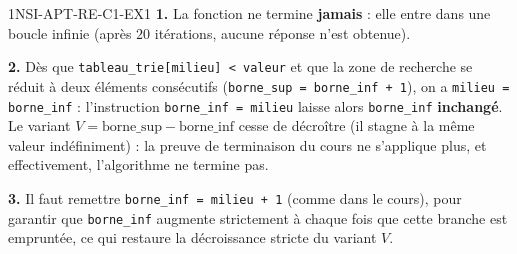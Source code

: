 
\begin{corrige}{1NSI-APT-RE-C1-EX1}
\textbf{1.} La fonction ne termine \textbf{jamais} : elle entre dans une boucle infinie
(après $20$ itérations, aucune réponse n'est obtenue).

\textbf{2.} Dès que \lstinline{tableau_trie[milieu] < valeur} et que la zone de recherche
se réduit à deux éléments consécutifs (\lstinline{borne_sup = borne_inf + 1}), on a
\lstinline{milieu = borne_inf} : l'instruction \lstinline{borne_inf = milieu} laisse alors
\lstinline{borne_inf} \textbf{inchangé}. Le variant $V=\text{borne\_sup}-\text{borne\_inf}$
cesse de décroître (il stagne à la même valeur indéfiniment) : la preuve de terminaison du
cours ne s'applique plus, et effectivement, l'algorithme ne termine pas.

\textbf{3.} Il faut remettre \lstinline{borne_inf = milieu + 1} (comme dans le cours), pour
garantir que \lstinline{borne_inf} augmente strictement à chaque fois que cette branche est
empruntée, ce qui restaure la décroissance stricte du variant $V$.
\end{corrige}
